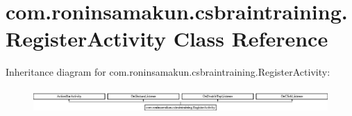 \section{com.\+roninsamakun.\+csbraintraining.\+Register\+Activity Class Reference}
\label{classcom_1_1roninsamakun_1_1csbraintraining_1_1_register_activity}
Inheritance diagram for com.\+roninsamakun.\+csbraintraining.\+Register\+Activity\+:\begin{figure}[H]
\begin{center}
\leavevmode
\includegraphics[height=0.918033cm]{classcom_1_1roninsamakun_1_1csbraintraining_1_1_register_activity}
\end{center}
\end{figure}
